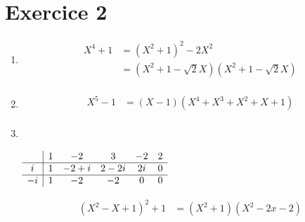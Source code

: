 \part{Exercice 2}

\begin{enumerate}
	\item
		\begin{align*}
			X^4 + 1 &= (X^2+1)^2 - 2X^2\\
			&= \left(X^2 + 1 - \sqrt{2}X\right)\left(X^2 +1-\sqrt{2}X\right) \\
		\end{align*}
	\item
		\begin{align*}
			X^5 - 1 &= (X-1)\left( X^4 + X^3 + X^2 + X + 1 \right) \\
		\end{align*}
	\item~\\
		\begin{center}
			$\begin{array}
				{c|c c c c c}
				&1&-2&3&-2&2\\ \hline
				i&1&-2+i&2-2i&2i&0\\ \hline
				-i&1&-2&-2&0&0
			\end{array}$
		\end{center}
		\begin{align*}
			(X^2 - X + 1)^2 + 1 &= (X^2+1)(X^2-2x-2)\\
		\end{align*}
\end{enumerate}

